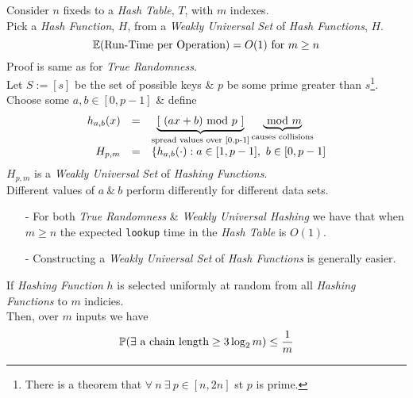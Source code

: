 \documentclass[11pt,a4paper]{article}
\begin{document}
Consider $n$ fixeds to a \textit{Hash Table}, $T$, with $m$ indexes.\\
Pick a \textit{Hash Function}, $H$, from a \textit{Weakly Universal Set} of \textit{Hash Functions}, $H$.
$$\mathbb{E}(\text{Run-Time per Operation})=O(1)\text{ for }m\geq n$$
\nb Proof is same as for \textit{True Randomness}.\\

Let $S:=[s]$ be the set of possible keys \& $p$ be some prime greater than $s$\footnote{There is a theorem that $\forall\ n\ \exists\ p\in[n,2n]$ st $p$ is prime.}.\\
Choose some $a,b\in[0,p-1]$ \& define
\[\begin{array}{rcl}
h_{a,b}(x)&=&\underbrace{[\ (ax+b)\ \mathrm{mod}\ p\ ]}_\text{spread values over [0,p-1]}\underbrace{\ \mathrm{mod}\ m}_\text{causes collisions}\\
H_{p,m}&=&\{h_{a,b}(\cdot):a\in[1,p-1],\ b\in[0,p-1]
\end{array}\]
\nb $H_{p,m}$ is a \textit{Weakly Universal Set} of \textit{Hashing Functions}.\\
\nb Different values of $a\ \&\ b$ perform differently for different data sets.\\

\begin{itemize}
	\item[-] For both \textit{True Randomness} \& \textit{Weakly Universal Hashing} we have that when $m\geq n$ the expected \lstinline!lookup! time in the \textit{Hash Table} is $O(1)$.
	\item[-] Constructing a \textit{Weakly Universal Set} of \textit{Hash Functions} is generally easier.
\end{itemize}

If \textit{Hashing Function} $h$ is selected uniformly at random from all \textit{Hashing Functions} to $m$ indicies.\\
Then, over $m$ inputs we have
$$\mathbb{P}(\exists\text{ a chain length}\geq3\log_2 m)\leq\frac1m$$
\end{document}
